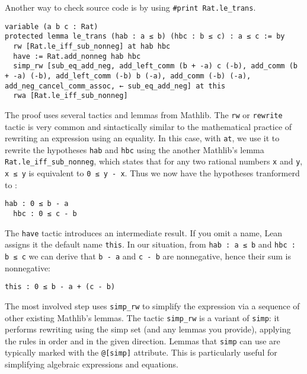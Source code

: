 Another way to check source code is by using \lstinline[language=lean]|#print Rat.le_trans|.
\begin{lstlisting}[language=lean,  float=!htb]
variable (a b c : Rat)
protected lemma le_trans (hab : a ≤ b) (hbc : b ≤ c) : a ≤ c := by
  rw [Rat.le_iff_sub_nonneg] at hab hbc
  have := Rat.add_nonneg hab hbc
  simp_rw [sub_eq_add_neg, add_left_comm (b + -a) c (-b), add_comm (b + -a) (-b), add_left_comm (-b) b (-a), add_comm (-b) (-a), add_neg_cancel_comm_assoc, ← sub_eq_add_neg] at this
  rwa [Rat.le_iff_sub_nonneg]
\end{lstlisting}
The proof uses several tactics and lemmas from Mathlib.
The \lstinline[language=lean]|rw| or \lstinline[language=lean]|rewrite| tactic  
is very common and sintactically similar to
the mathematical practice of rewriting an expression using an equality.
In this case, with \lstinline[language=lean]|at|, we use it to rewrite the 
hypotheses \lstinline[language=lean]|hab| 
and \lstinline[language=lean]|hbc|
using the another Mathlib's lemma \lstinline[language=lean]|Rat.le_iff_sub_nonneg|, 
which states that for any two rational numbers \lstinline[language=lean]|x| and
\lstinline[language=lean]|y|, \lstinline[language=lean]|x ≤ y| 
is equivalent to \lstinline[language=lean]|0 ≤ y - x|.
Thus we now have the hypotheses tranformerd to :  
\begin{lstlisting}[language=lean]
  hab : 0 ≤ b - a
  hbc : 0 ≤ c - b
\end{lstlisting}
The \lstinline[language=lean]|have| tactic introduces an intermediate result. 
If you omit a name, Lean assigns it the default name \lstinline[language=lean]|this|. 
In our situation, from \lstinline[language=lean]|hab : a ≤ b| and \lstinline[language=lean]|hbc : b ≤ c| 
we can derive that \lstinline[language=lean]|b - a| and \lstinline[language=lean]|c - b| 
are nonnegative, hence their sum is nonnegative:
\begin{lstlisting}[language=lean]
  this : 0 ≤ b - a + (c - b)
\end{lstlisting}
The most involved step uses \lstinline[language=lean]|simp_rw| to 
simplify the expression via a sequence of other existing Mathlib's lemmas. 
The tactic \lstinline[language=lean]|simp_rw| is a variant of \lstinline[language=lean]|simp|: 
it performs rewriting using the simp set (and any lemmas you provide), applying the rules 
in order and in the given direction. Lemmas that \lstinline[language=lean]|simp| can use 
are typically marked with the \lstinline[language=lean]|@[simp]| attribute. 
This is particularly useful for simplifying algebraic expressions and equations.

